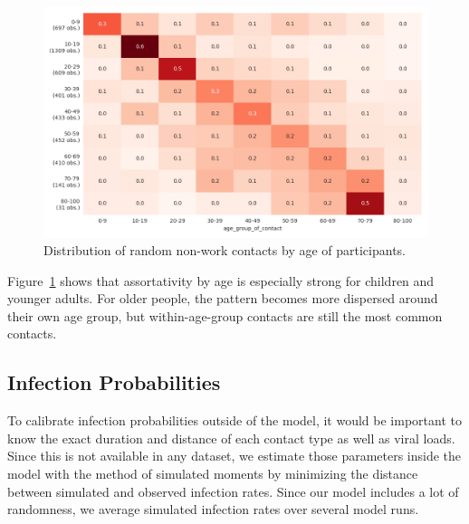 \begin{figure}[ht]
    \centering
    \includegraphics[width=0.9 \textwidth]{../figures/assortative_matching_probability_example}
    \caption{Distribution of random non-work contacts by age of participants.}
    \label{fig:assortativity}
\end{figure}

Figure~\ref{fig:assortativity} shows that
assortativity by age is especially strong for children and younger adults. For older
people, the pattern becomes more dispersed around their own age group, but
within-age-group contacts are still the most common contacts.

\FloatBarrier


\subsection{Infection Probabilities}
\label{sec:estimation}

To calibrate infection probabilities outside of the model, it would be important to know
the exact duration and distance of each contact type as well as viral loads. Since this
is not available in any dataset, we estimate those parameters inside the model with the
method of simulated moments \citep{McFadden1989} by minimizing the distance between
simulated and observed infection rates. Since our model includes a lot of randomness, we
average simulated infection rates over several model runs.

